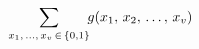 \documentclass[preview]{standalone}
\begin{document}
\begin{align*}
\special{dvisvgm:raw <g id='unique000'>}\sum_{x_1,\,\ldots,\,x_v\,\in\,\{0,1\}}\!\! g(x_1,\,x_2,\,\ldots,\,x_v)\special{dvisvgm:raw </g>}
\end{align*}
\end{document}
